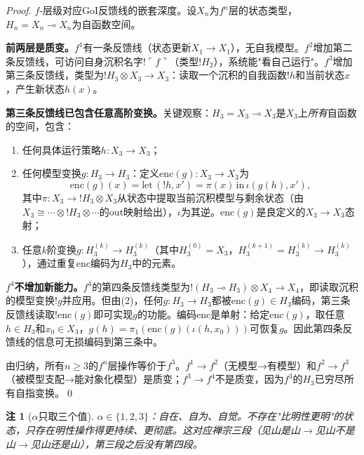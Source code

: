 \documentclass[11pt,a4paper]{article}
\newtheorem{remark}{注}
\newcommand{\lolli}{\multimap}
\newcommand{\bang}{{!}}
\newcommand{\tensor}{\otimes}
\newcommand{\enc}{\mathrm{enc}}
\begin{document}
\begin{proof}
$f$-层级对应GoI反馈线的嵌套深度。设$X_n$为$f^n$层的状态类型，$H_n=X_n\lolli X_n$为自函数空间。

\textbf{前两层是质变。}$f^1$有一条反馈线（状态更新$X_1\to X_1$），无自我模型。$f^2$增加第二条反馈线，可访问自身沉积名字$\bang\ulcorner f\urcorner$（类型$\bang H_2$），系统能"看自己运行"。$f^3$增加第三条反馈线，类型为$\bang H_3\tensor X_3\to X_3$：读取一个沉积的自我函数$\bang h$和当前状态$x$，产生新状态$h(x)$。

\textbf{第三条反馈线已包含任意高阶变换。}关键观察：$H_3=X_3\lolli X_3$是$X_3$上\emph{所有}自函数的空间，包含：
\begin{enumerate}
  \item 任何具体运行策略$h:X_3\to X_3$；
  \item 任何模型变换$g:H_3\to H_3$：定义$\mathrm{enc}(g):X_3\to X_3$为
  $$\mathrm{enc}(g)(x)=\mathrm{let}\,(\bang h, x')=\pi(x)\,\mathrm{in}\,\iota(g(h), x'),$$
  其中$\pi:X_3\to\bang H_3\tensor X_3$从状态中提取当前沉积模型与剩余状态（由$X_3\cong\cdots\tensor\bang H_3\tensor\cdots$的out映射给出），$\iota$为其逆。$\mathrm{enc}(g)$是良定义的$X_3\to X_3$态射；
  \item 任意$k$阶变换$g:H_3^{(k)}\to H_3^{(k)}$（其中$H_3^{(0)}=X_3$，$H_3^{(k+1)}=H_3^{(k)}\to H_3^{(k)}$），通过重复$\enc$编码为$H_3$中的元素。
\end{enumerate}

\textbf{$f^4$不增加新能力。}$f^4$的第四条反馈线类型为$\bang(H_3\lolli H_3)\tensor X_4\to X_4$，即读取沉积的模型变换$\bang g$并应用。但由(2)，任何$g:H_3\to H_3$都被$\mathrm{enc}(g)\in H_3$编码，第三条反馈线读取$\bang\mathrm{enc}(g)$即可实现$g$的功能。编码$\enc$是单射：给定$\mathrm{enc}(g)$，取任意$h\in H_3$和$x_0\in X_3$，$g(h)=\pi_1(\mathrm{enc}(g)(\iota(h,x_0)))$可恢复$g$。因此第四条反馈线的信息可无损编码到第三条中。

由归纳，所有$n\geq3$的$f^n$层操作等价于$f^3$。$f^1\to f^2$（无模型→有模型）和$f^2\to f^3$（被模型支配→能对象化模型）是质变；$f^3\to f^4$不是质变，因为$f^3$的$H_3$已穷尽所有自指变换。\qed
\end{proof}

\begin{remark}[$\alpha$只取三个值]
$\alpha\in\{1,2,3\}$：自在、自为、自觉。不存在"比明性更明"的状态，只存在明性操作得更持续、更彻底。这对应禅宗三段（见山是山$\to$见山不是山$\to$见山还是山），第三段之后没有第四段。
\end{remark}
\end{document}

